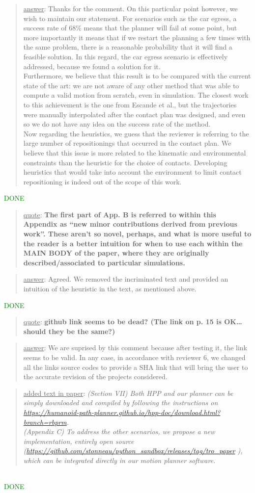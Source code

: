 \documentclass[a4paper]{article}
\newcommand{\done}[0]{\textcolor{green}{DONE}}
\newcommand\quot[1]{\begin{quote} \underline{quote}: \textbf{#1}\end{quote}}
\newcommand\as[1]{\begin{quote} \underline{answer}: {#1}\end{quote} }
\newcommand\qt[1]{\begin{quote} \underline{added text in paper}: \textit{#1}\end{quote} \leavevmode \\ }
\begin{document}
\as{Thanks for the comment. On this particular point however, we wish to maintain our statement. For scenarios such as the car egress, a success rate of $68 \%$ means that the planner
will fail at some point, but more importantly it means that if we restart the planning a few times with the same problem, there is a reasonable probability that it will find a feasible solution.
In this regard, the car egress scenario is effectively addressed, because we found a solution for it. \\
Furthermore, we believe that this result is to be compared with the current state of the art: we are not aware of any other method that was able
to compute a valid motion from scratch, even in simulation. The closest work to this achievement is the one from Escande et al., but the trajectories were manually interpolated
after the contact plan was designed, and even so we do not have any idea on the success rate of the method. \\
Now regarding the heuristics, we guess that the reviewer is referring to the large number of repositionings that occurred in the contact plan. We believe that this issue
is more related to the kinematic and environmental constraints than the heuristic for the choice of contacts. Developing heuristics that would take into account the environment to limit 
contact repositioning is indeed out of the scope of this work.}

\done

\quot{
The first part of App. B is referred to within this Appendix as “new minor contributions derived from previous work”. These aren’t so novel, perhaps, and what is more useful to the reader is a better intuition for when to use each within the MAIN BODY of the paper, where they are originally described/associated to particular simulations.
}

\as{Agreed. We removed the incriminated text and provided an intuition of the heuristic in the text, as mentioned above.}\done

\quot{github link seems to be dead? (The link on p. 15 is OK\dots should they be the same?)}

\as{We are suprised by this comment because after testing it, the link seems to be valid. In any case, in accordance with reviewer 6, we changed all the links source codes to provide a SHA link that will bring the user to the accurate revision of the projects considered.}
\qt{(Section VII) Both HPP and our planner can be simply downloaded and compiled by following the instructions on
\url{https://humanoid-path-planner.github.io/hpp-doc/download.html?branch=rbprm}. \\
(Appendix C) To address the other scenarios, we propose a new implementation, entirely open source (\url{https://github.com/stonneau/python_sandbox/releases/tag/tro_paper} ), which can be integrated directly in our motion planner software. }\done
\end{document}

